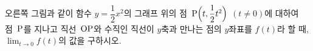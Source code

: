 \noindent\begin{minipage}[t]{0.58\linewidth}\vspace{0pt}\raggedright 오른쪽 그림과 같이 함수 $y=\dfrac{1}{2}x^2$의 그래프 위의 점~$\mathrm{P}\Big(t{,}\mkern3mu\mathopen{}\dfrac{1}{2}t^2\Big)$ $(t\ne 0)$에 대하여 점~$\mathrm{P}$를 지나고 직선~$\mathrm{OP}$와 수직인 직선이 $y$축과 만나는 점의 $y$좌표를 $f(t)$라 할 때, $\displaystyle\lim_{t\to 0} f(t)$의 값을 구하시오. \end{minipage}\hfill\begin{minipage}[t]{0.4\linewidth}\vspace{0pt}\centering \resizebox{\ifdim\width>\linewidth\linewidth\else\width\fi}{!}{}\end{minipage}\par
